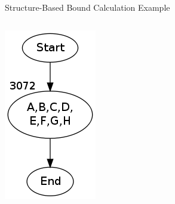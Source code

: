 \documentclass{beamer}
\begin{document}
\begin{frame}{Structure-Based Bound Calculation Example}
\begin{columns}
\begin{column}{0.25\textwidth}
      \includegraphics[scale=0.3]{structureoutput4.png}
    \end{column}
  \end{columns}
\end{frame}
\end{document}
